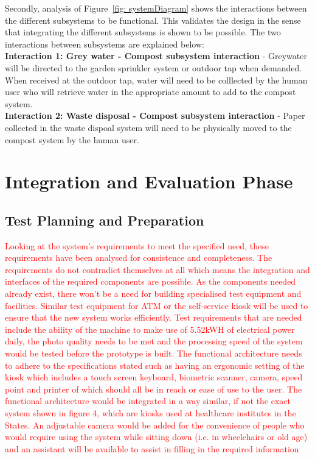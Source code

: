 \documentclass[a4paper,11pt,fleqn]{report}
\begin{document}
Secondly, analysis of Figure~\ref{fig: systemDiagram} shows the interactions between the different subsystems to be functional. This validates the design in the sense that integrating the different subsystems is shown to be possible. The two interactions between subsystems are explained below:\\

\textbf{Interaction 1: Grey water - Compost subsystem interaction} - Greywater will be directed to the garden sprinkler system or outdoor tap when demanded. When received at the outdoor tap, water will need to be colllected by the human user who will retrieve water in the appropriate amount to add to the compost system.\\

\textbf{Interaction 2: Waste disposal - Compost subsystem interaction} - Paper collected in the waste dispoal system will need to be physically moved to the compost system by the human user.

\section{Integration and Evaluation Phase}

\subsection{Test Planning and Preparation}
\textcolor{red}{Looking at the system’s requirements to meet the specified need, these requirements have been analysed for consistence and completeness. The requirements do not contradict themselves at all which means the integration and interfaces of the required components are possible. As the components needed already exist, there won’t be a need for building specialised test equipment and facilities. Similar test equipment for ATM or the self-service kiosk will be used to ensure that the new system works efficiently. Test requirements that are needed include the ability of the machine to make use of 5.52kWH of electrical power daily, the photo quality needs to be met and the processing speed of the system would be tested before the prototype is built. The functional architecture needs to adhere to the specifications stated such as having an ergonomic setting of the kiosk which includes a touch screen keyboard, biometric scanner, camera, speed point and printer of which should all be in reach or ease of use to the user. The functional architecture would be integrated in a way similar, if not the exact system shown in figure 4, which are kiosks used at healthcare institutes in the States. An adjustable camera would be added for the convenience of people who would require using the system while sitting down (i.e. in wheelchairs or old age) and an assistant will be available to assist in filling in the required information}
\end{document}
